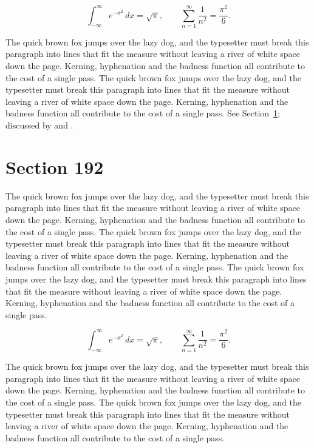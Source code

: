 \documentclass{article}
\begin{document}
\begin{equation}\label{eq:191}
\int_{-\infty}^{\infty} e^{-x^{2}}\,dx = \sqrt{\pi}, \qquad
\sum_{n=1}^{\infty} \frac{1}{n^{2}} = \frac{\pi^{2}}{6}.
\end{equation}

The quick brown fox jumps over the lazy dog, and the typesetter must break this paragraph into lines that fit the measure without leaving a river of white space down the page. Kerning, hyphenation and the badness function all contribute to the cost of a single pass. The quick brown fox jumps over the lazy dog, and the typesetter must break this paragraph into lines that fit the measure without leaving a river of white space down the page. Kerning, hyphenation and the badness function all contribute to the cost of a single pass. 
See Section~\ref{sec:192}; discussed by \textcite{k2} and \textcite{l4}.
\section{Section 192}
\label{sec:192}
The quick brown fox jumps over the lazy dog, and the typesetter must break this paragraph into lines that fit the measure without leaving a river of white space down the page. Kerning, hyphenation and the badness function all contribute to the cost of a single pass. The quick brown fox jumps over the lazy dog, and the typesetter must break this paragraph into lines that fit the measure without leaving a river of white space down the page. Kerning, hyphenation and the badness function all contribute to the cost of a single pass. The quick brown fox jumps over the lazy dog, and the typesetter must break this paragraph into lines that fit the measure without leaving a river of white space down the page. Kerning, hyphenation and the badness function all contribute to the cost of a single pass. 

\begin{equation}\label{eq:192}
\int_{-\infty}^{\infty} e^{-x^{2}}\,dx = \sqrt{\pi}, \qquad
\sum_{n=1}^{\infty} \frac{1}{n^{2}} = \frac{\pi^{2}}{6}.
\end{equation}

The quick brown fox jumps over the lazy dog, and the typesetter must break this paragraph into lines that fit the measure without leaving a river of white space down the page. Kerning, hyphenation and the badness function all contribute to the cost of a single pass. The quick brown fox jumps over the lazy dog, and the typesetter must break this paragraph into lines that fit the measure without leaving a river of white space down the page. Kerning, hyphenation and the badness function all contribute to the cost of a single pass. 
\end{document}
